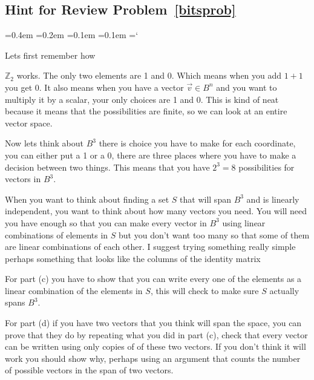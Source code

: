 
\subsection*{Hint for Review Problem~\ref{bitsprob}}

{\ttfamily
{}\font=0.4em
\font=0.2em
\font=0.1em
\font=0.1em
\hyphenchar\font=`\-


\hypertarget{linear_independence_hint}{Lets first remember how} $\mathbb{Z}_2$ works. The only two elements are 1 and 0. Which means when you add $1+1$ you get $0$. It also means when you have a vector $\vec{v} \in B^n$ and you want to multiply it by a scalar, your only choices are 1 and 0. This is kind of neat because it means that the possibilities are finite, so we can look at an entire vector space.

Now lets think about $B^3$ there is choice you have to make for each coordinate, you can either put a 1 or a 0, there are three places where you have to make a decision between two things. This means that you have $2^3= 8$ possibilities for vectors in $B^3$.

When you want to think about finding a set $S$ that will span $B^3$ and is linearly independent, you want to think about how many vectors you need. You will need you have enough so that you can make every vector in $B^3$ using linear combinations of elements in $S$ but you don't want too many so that some of them are linear combinations of each other. I suggest trying something really simple perhaps something that looks like the columns of the identity matrix

For part (c) you have to show that you can write every one of the elements as a linear combination of the elements in $S$, this will check to make sure $S$ actually spans $B^3$. 

For part (d) if you have two vectors that you think will span the space, you can prove that they do by repeating what you did in part (c), check that every vector can be written using only copies of of these two vectors. If you don't think it will work you should show why, perhaps using an argument that counts the number of possible vectors in the span of two vectors.




} %

